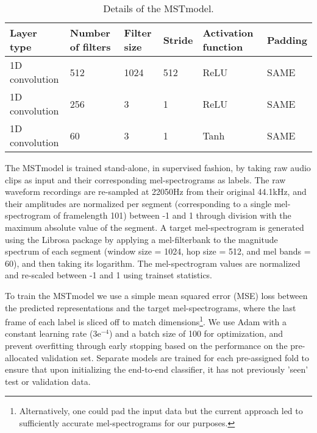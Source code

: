 \documentclass{article}
\begin{document}
\begin{table}[h!]
\centering
\caption{Details of the MSTmodel.}
\label{table:network}
\begin{tabular}{@{}llllll@{}}
\toprule
 Layer type  & Number of filters & Filter size & Stride & Activation function & Padding \\ \midrule
1D convolution & 512 & 1024  & 512   & ReLU & SAME   \\
1D convolution & 256 & 3  & 1   & ReLU & SAME   \\
1D convolution & 60 & 3  & 1   & Tanh & SAME  \\ \bottomrule
\end{tabular}
\end{table}

The MSTmodel is trained stand-alone, in supervised fashion, by taking raw audio clips as input and their corresponding mel-spectrograms as labels. The raw waveform recordings are re-sampled at 22050Hz from their original 44.1kHz, and their amplitudes are normalized per segment (corresponding to a single mel-spectrogram of framelength 101) between -1 and 1 through division with the maximum absolute value of the segment. A target mel-spectrogram is generated using the Librosa package \cite{mcfee_brian_2017_293021} by applying a mel-filterbank to the magnitude spectrum of each segment (window size = 1024, hop size = 512, and mel bands = 60), and then taking its logarithm. The mel-spectrogram values are normalized and re-scaled between -1 and 1 using trainset statistics.

To train the MSTmodel we use a simple mean squared error (MSE) loss between the predicted representations and the target mel-spectrograms, where the last frame of each label is sliced off to match dimensions\footnote{Alternatively, one could pad the input data but the current approach led to sufficiently accurate mel-spectrograms for our purposes.}. We use Adam \cite{kingma2014adam} with a constant learning rate ($\mathrm{3e^{-4}}$) and a batch size of 100 for optimization, and prevent overfitting through early stopping based on the performance on the pre-allocated validation set. Separate models are trained for each pre-assigned fold to ensure that upon initializing the end-to-end classifier, it has not previously 'seen' test or validation data. 
\end{document}
